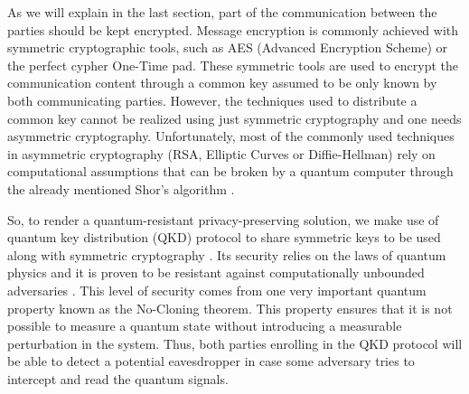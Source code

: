 As we will explain in the last section, part of the communication between the parties should be kept encrypted. Message encryption is commonly achieved with symmetric cryptographic tools, such as AES (Advanced Encryption Scheme) or the perfect cypher One-Time pad. These symmetric tools are used to encrypt the communication content through a common key assumed to be only known by both communicating parties. However, the techniques used to distribute a common key cannot be realized using just symmetric cryptography and one needs asymmetric cryptography. Unfortunately, most of the commonly used techniques in asymmetric cryptography (RSA, Elliptic Curves or Diffie-Hellman) rely on computational assumptions that can be broken by a quantum computer through the already mentioned Shor's algorithm \cite{Shor1995}.

So, to render a quantum-resistant privacy-preserving solution, we make use of quantum key distribution (QKD) protocol to share symmetric keys to be used along with symmetric cryptography \cite{Pirandola2020, Almeida2020, Silva2019, Almeida2021}. Its security relies on the laws of quantum physics and it is proven to be resistant against computationally unbounded adversaries \cite{Renner05, Tomamichel2017}. This level of security comes from one very important quantum property known as the No-Cloning theorem. This property ensures that it is not possible to measure a quantum state without introducing a measurable perturbation in the system. Thus, both parties enrolling in the QKD protocol will be able to detect a potential eavesdropper in case some adversary tries to intercept and read the quantum signals.


%



